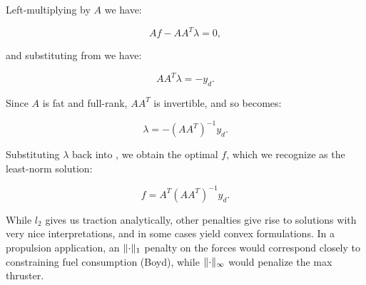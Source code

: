 \documentclass[12pt]{article}
\DeclarePairedDelimiter{\norm}{\lVert}{\rVert}
\begin{document}
Left-multiplying  by $A$ we have:

\begin{equation}
Af - A A^T \lambda = 0, 
\end{equation}

and substituting from  we have: 

\begin{equation}
A A^T \lambda = -y_d. \label{eq:AATLambda}
\end{equation}

Since $A$ is fat and full-rank, $A A^T$ is invertible, and so  becomes: 

\begin{equation}
\lambda = -(A A^T)^{-1} y_d.
\end{equation}

Substituting $\lambda$ back into , we obtain the optimal $f$, which we recognize as the least-norm solution:

\begin{equation}
f = A^T (A A^T)^{-1} y_d.
\end{equation}

While $l_2$ gives us traction analytically, other penalties give rise to 
solutions with very nice interpretations, and in some cases yield convex
formulations. In a propulsion application, an $\norm{\cdot}_1$ penalty on the forces would correspond closely to constraining fuel consumption (Boyd), while $\norm{\cdot}_\infty$ would penalize the max thruster.
\end{document}
